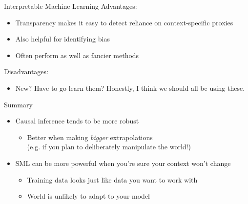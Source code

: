\documentclass[11pt,handout]{beamer}
\begin{document}
\begin{frame}[c]{Interpretable Machine Learning}
Advantages:
\begin{itemize}
  \item Transparency makes it easy to detect reliance on context-specific proxies
  \item Also helpful for identifying bias
  \item Often perform as well as fancier methods
\end{itemize}
Disadvantages:
\begin{itemize}
  \item New? Have to go learn them? Honestly, I think we should all be using these.
\end{itemize}
\end{frame}

\begin{frame}[c]{Summary}
  \begin{itemize}
    \item Causal inference tends to be more robust
    \begin{itemize}
      \item Better when making \emph{bigger} extrapolations \\
      (e.g. if you plan to deliberately \alert{manipulate} the world!)
    \end{itemize}
    \item SML can be more powerful when you're sure your context won't change
    \begin{itemize}
      \item Training data looks just like data you want to work with
      \item World is unlikely to adapt to your model
    \end{itemize}
  \end{itemize}
\end{frame}
\end{document}
